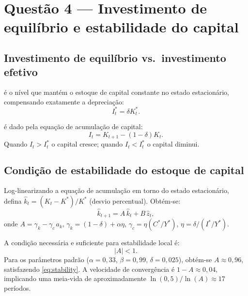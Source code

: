 \documentclass[11pt,a4paper]{article}
\newcommand{\hk}{\hat{k}}
\newcommand{\hz}{\hat{z}}
\begin{document}
\section{Questão 4 --- Investimento de equilíbrio e estabilidade do capital}

\subsection{Investimento de equilíbrio vs.\ investimento efetivo}

\begin{description}[leftmargin=2em]
  \item[\textbf{Investimento de equilíbrio}] é o nível que mantém o estoque
    de capital constante no estado estacionário, compensando exatamente a depreciação:
    \begin{equation}
      I^*_t = \delta K^*_t.
    \end{equation}
  \item[\textbf{Investimento efetivo}] é dado pela equação de acumulação de capital:
    \begin{equation}
      I_t = K_{t+1} - (1-\delta)K_t.
    \end{equation}
    Quando $I_t > I^*_t$ o capital cresce; quando $I_t < I^*_t$ o capital diminui.
\end{description}

\subsection{Condição de estabilidade do estoque de capital}

Log-linearizando a equação de acumulação em torno do estado estacionário,
defina $\hk_t = (K_t - K^*)/K^*$ (desvio percentual). Obtém-se:
\begin{equation}
  \hk_{t+1} = A\,\hk_t + B\,\hz_t,
\end{equation}
onde $A = \gamma_k - \gamma_c\, a_k$, $\gamma_k = (1-\delta)+\alpha\eta$,
$\gamma_c = \eta(C^*/Y^*)$, $\eta = \delta/(I^*/Y^*)$.

A condição necessária e suficiente para estabilidade local é:
\begin{equation}\label{eq:stability}
  \boxed{|A| < 1.}
\end{equation}
Para os parâmetros padrão ($\alpha=0{,}33$, $\beta=0{,}99$, $\delta=0{,}025$),
obtém-se $A \approx 0{,}96$, satisfazendo \eqref{eq:stability}.
A velocidade de convergência é $1-A \approx 0{,}04$, implicando uma meia-vida de
aproximadamente $\ln(0{,}5)/\ln(A) \approx 17$ períodos.
\end{document}
